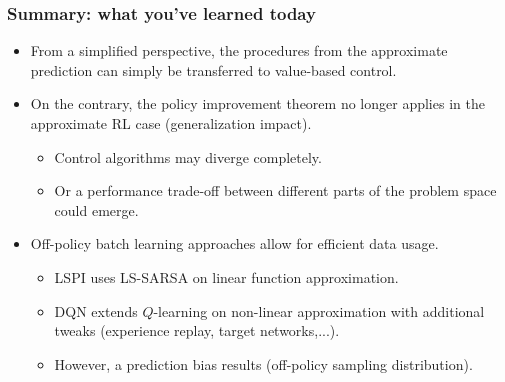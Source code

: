 \begin{frame}
	\frametitle{Summary: what you've learned today}
	\begin{itemize}
		\item From a simplified perspective, the procedures from the approximate prediction can simply be transferred to value-based control.\pause
		\item On the contrary, the policy improvement theorem no longer applies in the approximate RL case (generalization impact).\pause
		      \begin{itemize}
			      \item Control algorithms may diverge completely.\pause
			      \item Or a performance trade-off between different parts of the problem space could emerge.\pause
		      \end{itemize}
		\item Off-policy batch learning approaches allow for efficient data usage.
		      \begin{itemize}
			      \item LSPI uses LS-SARSA on linear function approximation.\pause
			      \item DQN extends $Q$-learning on non-linear approximation with additional tweaks (experience replay, target networks,...).\pause
			      \item However, a prediction bias results (off-policy sampling distribution).
		      \end{itemize}
	\end{itemize}
\end{frame}